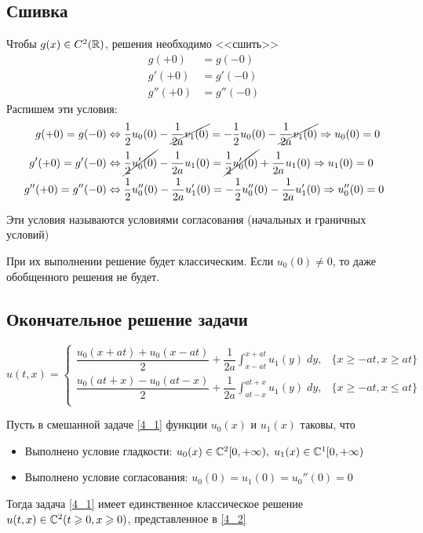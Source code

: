 \documentclass[../main.tex]{subfiles}
\begin{document}
\subsection{Сшивка}
Чтобы $g(x) \in C^2(\mathbb{R})$, решения необходимо <<сшить>>
\begin{align*}
    g(+0) &= g(-0) \\
    g'(+0) &= g'(-0) \\
    g''(+0) &= g''(-0)
\end{align*}
Распишем эти условия:
\begin{align*}
     g(+0) = g(-0) &\Leftrightarrow 
    \frac{1}{2}u_0(0) - \cancel{\frac{1}{2a}v_1(0)} = -\frac{1}{2}u_0(0) - \cancel{\frac{1}{2a}v_1(0)} \Rightarrow u_0(0) = 0 \\
     g'(+0) = g'(-0) &\Leftrightarrow \cancel{\frac{1}{2}u'_0(0)} - \frac{1}{2a}u_1(0) =
    \cancel{\frac{1}{2}u'_0(0)} + \frac{1}{2a}u_1(0) \Rightarrow u_1(0) = 0 \\
     g''(+0) = g''(-0) &\Leftrightarrow \frac{1}{2} u''_0(0) - \frac{1}{2a} u_1'(0) = -\frac{1}{2}u_0''(0) - \frac{1}{2a} u_1'(0) \Rightarrow u_0''(0) = 0
\end{align*}

\begin{definition}
    Эти условия называются условиями согласования (начальных и граничных условий)
\end{definition}

При их выполнении решение будет классическим. Если $u_0(0) \ne 0$, то даже обобщенного решения не будет.

\subsection{Окончательное решение задачи}

\begin{equation} \label{4_2}
        u(t, x) = \begin{cases}
            \dfrac{u_0(x+at) + u_0(x-at)}{2} + \dfrac{1}{2a}\displaystyle\int_{x-at}^{x+at}u_1(y)\;dy, & \{x\geq -at, x\geq at\} \\
            \dfrac{u_0(at+x) - u_0(at-x)}{2} + \dfrac{1}{2a}\displaystyle\int_{at-x}^{at+x}u_1(y)\;dy, & \{x\geq -at, x\leq at\} \\
        \end{cases}
\end{equation}
\vspace{0pt}

\begin{theorem}
    Пусть в смешанной задаче \ref{4_1} функции $u_0(x)$ и $u_1(x)$ таковы, что 
    \begin{itemize}
        \item Выполнено условие гладкости: $u_0(x)\in \mathbb{C}^2[0, +\infty), \; u_1(x) \in \mathbb{C}^1[0, +\infty)$
        \item Выполнено условие согласования: $u_0(0) = u_1(0) = u_0''(0) = 0$
    \end{itemize}
    Тогда задача \ref{4_1} имеет единственное классическое решение $u(t,x) \in \mathbb{C}^2(t \geqslant 0, x\geqslant 0)$, представленное в \ref{4_2}
\end{theorem}
\end{document}
